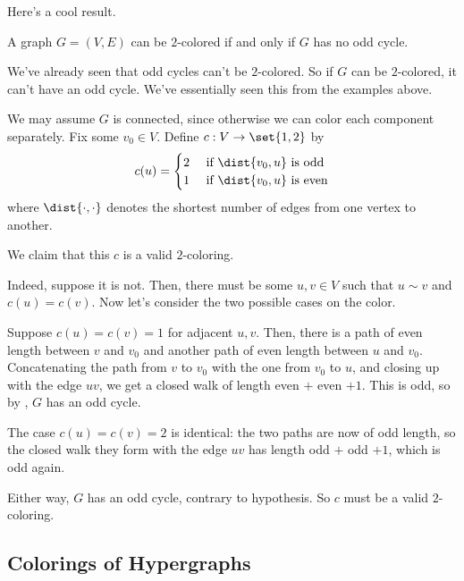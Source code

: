 Here's a cool result.

\begin{boxtheorem}
    A graph $G = (V, E)$ can be $2$-colored if and only if $G$ has no odd cycle.
\end{boxtheorem}
\begin{iffproof}
    \onlyifdir We've already seen that odd cycles can't be $2$-colored. So if $G$ can be $2$-colored, it can't have an odd cycle. We've essentially seen this from the examples above.

    \ifdir We may assume $G$ is connected, since otherwise we can color each component separately. Fix some $v_0 \in V$. Define $c : V \to \set{1, 2}$ by
    \begin{align*}
        c(u) =
        \begin{cases}
            2 & \text{ if } \dist{v_0, u} \text{ is odd} \\
            1 & \text{ if } \dist{v_0, u} \text{ is even}
        \end{cases}
    \end{align*}
    where $\dist{\cdot, \cdot}$ denotes the shortest number of edges from one vertex to another.

    We claim that this $c$ is a valid $2$-coloring.

    Indeed, suppose it is not. Then, there must be some $u, v \in V$ such that $u \sim v$ and $c(u) = c(v)$. Now let's consider the two possible cases on the color.

    Suppose $c(u) = c(v) = 1$ for adjacent $u, v$. Then, there is a path of even length between $v$ and $v_0$ and another path of even length between $u$ and $v_0$. Concatenating the path from $v$ to $v_0$ with the one from $v_0$ to $u$, and closing up with the edge $uv$, we get a closed walk of length even $+$ even $+ 1$. This is odd, so by , $G$ has an odd cycle.

    The case $c(u) = c(v) = 2$ is identical: the two paths are now of odd length, so the closed walk they form with the edge $uv$ has length odd $+$ odd $+ 1$, which is odd again.

    Either way, $G$ has an odd cycle, contrary to hypothesis. So $c$ must be a valid $2$-coloring.
\end{iffproof}

\subsection{Colorings of Hypergraphs}

